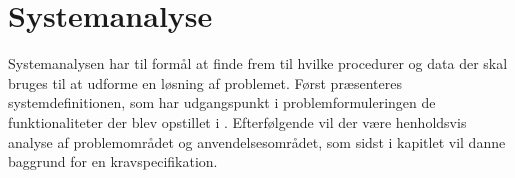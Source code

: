 \chapter{Systemanalyse}\label{chapter:systemanalyse}
Systemanalysen har til formål at finde frem til hvilke procedurer og data der skal bruges til at udforme en løsning af problemet.
Først præsenteres systemdefinitionen, som har udgangspunkt i problemformuleringen de funktionaliteter der blev opstillet i .
Efterfølgende vil der være henholdsvis analyse af problemområdet og anvendelsesområdet, som sidst i kapitlet vil danne baggrund for en kravspecifikation.






